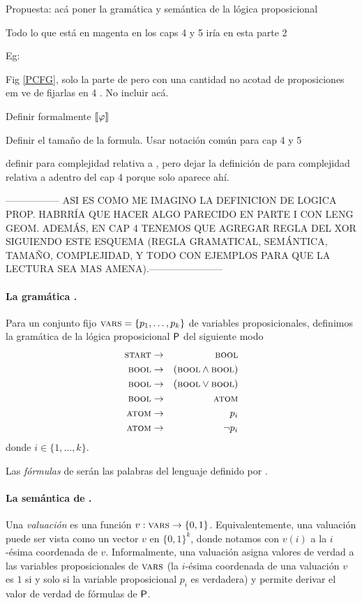 

    \color{magenta}
    Propuesta: acá poner la gramática y semántica de la lógica proposicional

    Todo lo que está en magenta en los caps 4 y 5 iría en esta parte 2

    Eg:
    
    Fig \ref{PCFG}, solo la parte de \grambool pero con una cantidad no acotad de proposiciones em ve de fijarlas en 4 . No incluir \gramboolxor acá.

    Definir formalmente $\llbracket \varphi\rrbracket$

    Definir el tamaño de la formula. Usar notación común para cap 4 y 5

    definir  \mdlbool para complejidad relativa a \grambool, pero dejar la definición de
      \mdlboolxor para complejidad relativa a \gramboolxor adentro del cap 4 porque solo aparece ahí. 


----------------- ASI ES COMO ME IMAGINO LA DEFINICION DE LOGICA PROP. HABRRÍA QUE HACER ALGO PARECIDO EN PARTE I CON LENG GEOM. ADEMÁS, EN CAP 4 TENEMOS QUE AGREGAR REGLA DEL XOR SIGUIENDO ESTE ESQUEMA (REGLA GRAMATICAL, SEMÁNTICA, TAMAÑO, COMPLEJIDAD, Y TODO CON EJEMPLOS PARA QUE LA LECTURA SEA MAS AMENA).-----------------------

\paragraph{La gramática \grambool.}
Para un conjunto fijo $\textsc{vars}=\{p_1,\dots,p_k\}$ de variables proposicionales, definimos la gramática de la lógica proposicional ${\sf P}$ del siguiente modo
%
\begin{eqnarray*}
\textsc{start} &\to&\textsc{bool}\\
\textsc{bool} &\to&(\textsc{bool} \wedge \textsc{bool}) \\
\textsc{bool} &\to&(\textsc{bool} \vee \textsc{bool}) \\
\textsc{bool} &\to&\textsc{atom}\\
\textsc{atom} &\to& p_i \\
\textsc{atom} &\to&\lnot p_i 
\end{eqnarray*}
donde $i\in\{1,\dots,k\}$.

Las {\em fórmulas} de \grambool serán las palabras del lenguaje definido por \grambool.


\paragraph{La semántica de \grambool.}
Una {\em valuación} es una función $v:\textsc{vars}\to\{0,1\}$. Equivalentemente, una valuación puede ser vista como un vector $v$ en $\{0,1\}^k$, donde notamos con $v(i)$ a la $i$-ésima coordenada de $v$. Informalmente, una valuación asigna valores de verdad a las variables proposicionales de $\textsc{vars}$ (la $i$-ésima coordenada de una valuación $v$ es $1$ si y solo si la variable proposicional $p_i$ es verdadera) y permite derivar el valor de verdad de fórmulas de ${\sf P}$.  

